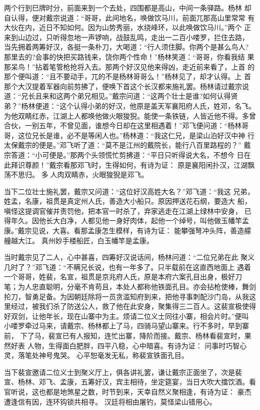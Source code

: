 两个行到巳牌时分，前面来到一个去处，四围都是高山，中间一条驿路。杨林
却自认得，便对戴宗说道：“哥哥，此间地名，唤做饮马川，前面兀那高山里常常
有大伙在内，近日不知如何。因为山势秀丽，水绕峰环，以此唤做饮马川。”两个
正来到山边过，只听得忽地一声锣响，战鼓乱鸣，走出一二百小喽罗，拦住去路，
当先拥着两筹好汉，各挺一条朴刀，大喝道：“行人须住脚。你两个是甚么鸟人?
那里去的?会事的快把买路钱来，饶你两个性命！”杨林笑道：“哥哥，你看我结
果那呆鸟！”拈着笔管枪抢将入去。那两个好汉见他来得凶，走近前来看了，上首
的那个便叫道：“且不要动手，兀的不是杨林哥哥么！”杨林见了，却才认得。上
首那个大汉提着军器向前剪拂了，便唤下首这个长汉都来施礼罢。杨林请过戴宗说
道：“兄长且来和这两个弟兄相见。”戴宗问道：“这两个壮士是谁?如何认得贤
弟？”杨林便道：“这个认得小弟的好汉，他原是盖天军襄阳府人氏，姓邓，名飞。
为他双睛红赤，江湖上人都唤他做火眼狻猊。能使一条铁链，人皆近他不得。多曾
合伙，一别五年，不曾见面，谁想今日却在这里相遇着！”邓飞便问道：“杨林哥
哥，这位兄长是谁，必不是等闲人也。”杨林道：“我这仁兄，是梁山泊好汉中神
行太保戴宗的便是。”邓飞听了道：“莫不是江州的戴院长，能行八百里路程的？”
戴宗答道：“小可便是。”那两个头领慌忙剪拂道：“平日只听得说大名，不想今
日在此拜识尊颜！”戴宗看那邓飞时，生得如何，有诗为证：
原是襄阳闲扑汉，江湖飘荡不思归。
多人肉双睛赤，火眼狻猊是邓飞。

当下二位壮士施礼罢，戴宗又问道：“这位好汉高姓大名？”邓飞道：“我这
兄弟，姓孟，名康，祖贯是真定州人氏，善造大小船只。原因押送花石纲，要造大
船，嗔怪这提调官催并责罚他，把本官一时杀了，弃家逃走在江湖上绿林中安身，
已得年久。因他长大白净，人都见他一身好肉体，起他一个绰号，叫他做玉幡竿孟
康。”戴宗见说，大喜。看那孟康怎生模样，有诗为证：
能攀强弩冲头阵，善造艨艟越大江。
真州妙手楼船匠，白玉幡竿是孟康。

当时戴宗见了二人，心中甚喜，四筹好汉说话间，杨林问道：“二位兄弟在此
聚义几时了？”邓飞道：“不瞒兄长说，也有一年多了。只半载前在这直西地面上
遇着一个哥哥，姓裴，名宣，祖贯是京兆府人氏，原是本府六案孔目出身，极好刀
笔；为人忠直聪明，分毫不肯苟且，本处人都称他铁面孔目。亦会拈枪使棒，舞剑
抡刀，智勇足备。为因朝廷除将一员贪滥知府到来，把他寻事刺配沙门岛，从我这
里经过，被我们杀了防送公人，救了他在此安身，聚集得三二百人。这裴宣极使得
好双剑，让他年长，现在山寨中为主。烦请二位义士同往小寨，相会片时。”便叫
小喽罗牵过马来，请戴宗、杨林都上了马，四骑马望山寨来。行不多时，早到寨前，
下了马，裴宣已有人报知，连忙出寨，降阶而接。戴宗、杨林看裴宣时，果然好表
人物，生得面白肥胖，四平八稳，心中暗喜。有诗为证：
问事时巧智心灵，落笔处神号鬼哭。
心平恕毫发无私，称裴宣铁面孔目。

当下裴宣邀请二位义士到聚义厅上，俱各讲礼罢，谦让戴宗正面坐了，次是裴
宣、杨林、邓飞、孟康，五筹好汉，宾主相待，坐定筵宴，当日大吹大擂饮酒。看
官听说，这也都是地煞星之数，时节到来，天幸自然义聚相逢，有诗为证：
豪杰遭逢信有因，连环钩锁共相寻。
汉廷将相由屠钓，莫怪梁山错用心。

